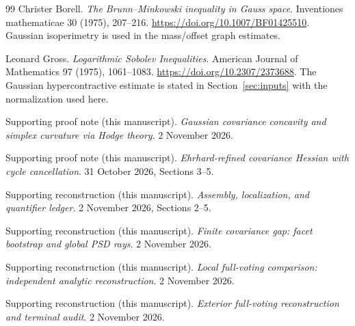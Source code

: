 \begin{thebibliography}{99}
Christer Borell. \emph{The Brunn--Minkowski inequality in Gauss space}.
Inventiones mathematicae 30 (1975), 207--216.
\url{https://doi.org/10.1007/BF01425510}.
 Gaussian isoperimetry is used in the
mass/offset graph estimates.

Leonard Gross. \emph{Logarithmic Sobolev Inequalities}.
American Journal of Mathematics 97 (1975), 1061--1083.
\url{https://doi.org/10.2307/2373688}.
 The Gaussian hypercontractive estimate
is stated in Section~\ref{sec:inputs} with the normalization used here.



Supporting proof note (this manuscript). \emph{Gaussian covariance concavity and simplex curvature via Hodge theory}. 2 November 2026.
\par{}

Supporting proof note (this manuscript). \emph{Ehrhard-refined covariance Hessian with cycle cancellation}. 31 October 2026, Sections 3--5.
\par{}

Supporting reconstruction (this manuscript). \emph{Assembly, localization, and quantifier ledger}. 2 November 2026, Sections 2--5.
\par{}

Supporting reconstruction (this manuscript). \emph{Finite covariance gap: facet bootstrap and global PSD rays}. 2 November 2026.
\par{}

Supporting reconstruction (this manuscript). \emph{Local full-voting comparison: independent analytic reconstruction}. 2 November 2026.
\par{}

Supporting reconstruction (this manuscript). \emph{Exterior full-voting reconstruction and terminal audit}. 2 November 2026.
\par{}


\end{thebibliography}
